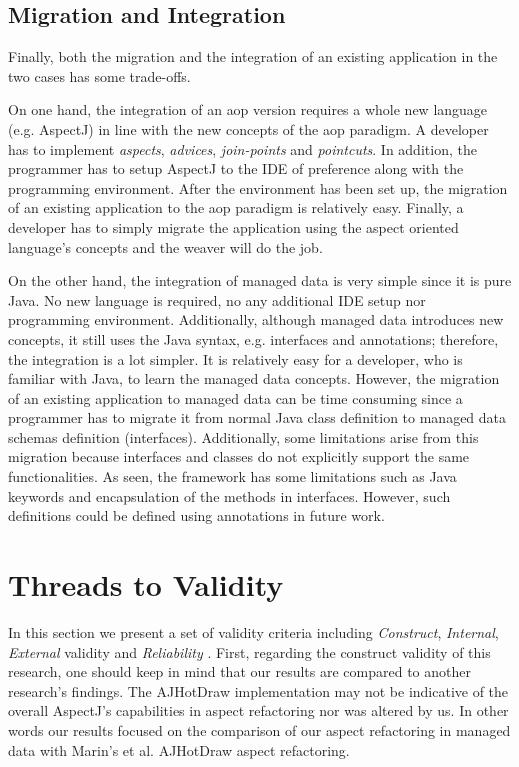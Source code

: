 \subsection{Migration and Integration}
Finally, both the migration and the integration of an existing application in the two cases has some trade-offs.

On one hand, the integration of an \ac{aop} version requires a whole new language (e.g. AspectJ) in line with the new concepts of the \ac{aop} paradigm.
A developer has to implement \textit{aspects}, \textit{advices}, \textit{join-points} and \textit{pointcuts}. 
In addition, the programmer has to setup AspectJ to the IDE of preference along with the programming environment.
After the environment has been set up, the migration of an existing application to the \ac{aop} paradigm is relatively easy.
Finally, a developer has to simply migrate the application using the aspect oriented language's concepts and the weaver will do the job.

On the other hand, the integration of managed data is very simple since it is pure Java.
No new language is required, no any additional IDE setup nor programming environment.
Additionally, although managed data introduces new concepts, it still uses the Java syntax, e.g. interfaces and annotations; therefore, the integration is a lot simpler.
It is relatively easy for a developer, who is familiar with Java, to learn the managed data concepts.
However, the migration of an existing application to managed data can be time consuming since a programmer has to migrate it from normal Java class definition  to managed data schemas definition (interfaces).
Additionally, some limitations arise from this migration because interfaces and classes do not explicitly support the same functionalities.
As seen, the framework has some limitations such as Java keywords and encapsulation of the methods in interfaces.
However, such definitions could be defined using annotations in future work.

\section{Threads to Validity}
In this section we present a set of validity criteria including \textit{Construct}, \textit{Internal}, \textit{External} validity and \textit{Reliability} \cite{easterbrook2008selecting}.
First, regarding the construct validity of this research, one should keep in mind that our results are compared to another research's findings. 
The AJHotDraw implementation may not be indicative of the overall AspectJ's capabilities in aspect refactoring nor was altered by us.
In other words our results focused on the comparison of our aspect refactoring in managed data with Marin's et al. AJHotDraw aspect refactoring.

